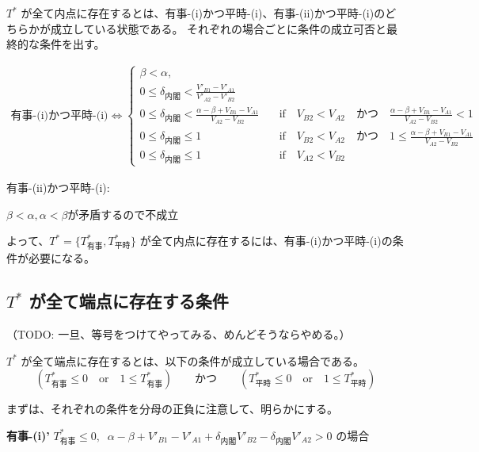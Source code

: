 \documentclass[main.tex]{subfiles}
\begin{document}
\bigskip
$T^*$ が全て内点に存在するとは、有事-(i)かつ平時-(i)、有事-(ii)かつ平時-(i)のどちらかが成立している状態である。
それぞれの場合ごとに条件の成立可否と最終的な条件を出す。

\noindent
\begin{align*}
    \text{有事-(i)かつ平時-(i)} \Leftrightarrow 
    \begin{cases}
        \beta < \alpha, \\
        0 \le \delta_{内閣} < \frac{V'_{B1}-V'_{A1}}{V'_{A2} - V'_{B2}}\\
        0 \le \delta_{内閣} < \frac{\alpha-\beta + V_{B1}-V_{A1}}{V_{A2} - V_{B2}} \quad&\text{if}\quad V_{B2} < V_{A2} \quad{かつ}\quad \frac{\alpha-\beta + V_{B1}-V_{A1}}{V_{A2} - V_{B2}}<1\\
        0 \le \delta_{内閣} \le 1 \quad&\text{if}\quad V_{B2} < V_{A2} \quad{かつ}\quad 1 \le \frac{\alpha-\beta + V_{B1}-V_{A1}}{V_{A2} - V_{B2}}\\
        0 \le \delta_{内閣} \le 1 \quad&\text{if}\quad V_{A2} < V_{B2}
    \end{cases}
\end{align*}

\noindent
有事-(ii)かつ平時-(i):

$\beta < \alpha, \alpha < \beta$が矛盾するので不成立


\bigskip
よって、$T^* = \lbrace T^*_{有事}, T^*_{平時} \rbrace$ が全て内点に存在するには、有事-(i)かつ平時-(i)の条件が必要になる。











\subsection{$T^*$ が全て端点に存在する条件}

（TODO: 一旦、等号をつけてやってみる、めんどそうならやめる。）

$T^*$ が全て端点に存在するとは、以下の条件が成立している場合である。\\
$$(T^*_{有事} \le 0 \quad\text{or}\quad 1 \le T^*_{有事}) \quad\quad\text{かつ}\quad\quad (T^*_{平時} \le 0 \quad\text{or}\quad 1 \le T^*_{平時}) $$


まずは、それぞれの条件を分母の正負に注意して、明らかにする。

\bigskip
\textbf{有事-(i)'}\; $T^*_{有事} \le 0,\;\; \alpha-\beta + V'_{B1}-V'_{A1} + \delta_{内閣}V'_{B2} - \delta_{内閣}V'_{A2} > 0$ の場合
\end{document}
